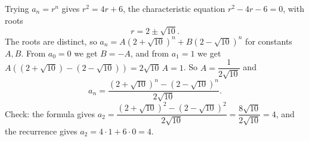 Trying $a_n=r^n$ gives $r^2=4r+6$, the characteristic equation $r^2-4r-6=0$, with roots
\[r=2\pm\sqrt{10}.\]
The roots are distinct, so $a_n=A\left(2+\sqrt{10}\right)^n+B\left(2-\sqrt{10}\right)^n$ for constants $A,B$. From $a_0=0$ we get $B=-A$, and from $a_1=1$ we get $A\left(\left(2+\sqrt{10}\right)-\left(2-\sqrt{10}\right)\right)=2\sqrt{10}\,A=1$. So $A=\dfrac{1}{2\sqrt{10}}$ and
\[\boxed{a_n=\dfrac{\left(2+\sqrt{10}\right)^n-\left(2-\sqrt{10}\right)^n}{2\sqrt{10}}}.\]
Check: the formula gives $a_2=\dfrac{\left(2+\sqrt{10}\right)^2-\left(2-\sqrt{10}\right)^2}{2\sqrt{10}}=\dfrac{8\sqrt{10}}{2\sqrt{10}}=4$, and the recurrence gives $a_2=4\cdot1+6\cdot0=4$.
